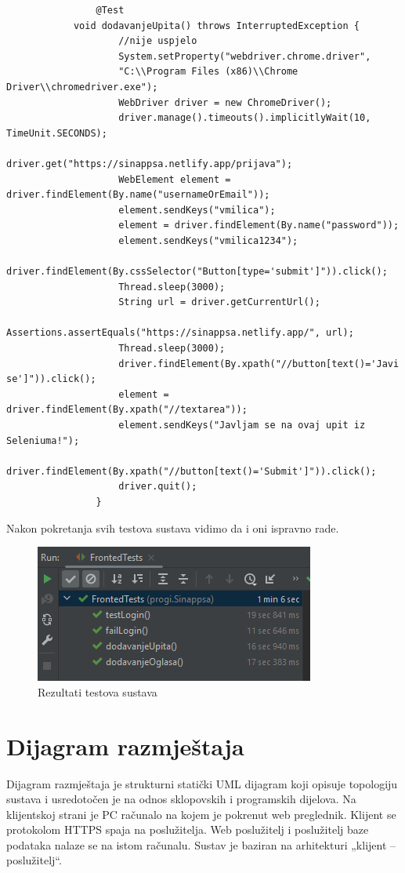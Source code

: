 			\begin{verbatim}
			    @Test
		    void dodavanjeUpita() throws InterruptedException {
			        //nije uspjelo
			        System.setProperty("webdriver.chrome.driver", 
			        "C:\\Program Files (x86)\\Chrome Driver\\chromedriver.exe");
			        WebDriver driver = new ChromeDriver();
			        driver.manage().timeouts().implicitlyWait(10, TimeUnit.SECONDS);
		            driver.get("https://sinappsa.netlify.app/prijava");
			        WebElement element = driver.findElement(By.name("usernameOrEmail"));
			        element.sendKeys("vmilica");
			        element = driver.findElement(By.name("password"));
			        element.sendKeys("vmilica1234");
			        driver.findElement(By.cssSelector("Button[type='submit']")).click();
			        Thread.sleep(3000);
			        String url = driver.getCurrentUrl();
			        Assertions.assertEquals("https://sinappsa.netlify.app/", url);
			        Thread.sleep(3000);
			        driver.findElement(By.xpath("//button[text()='Javi se']")).click();
			        element = driver.findElement(By.xpath("//textarea"));
			        element.sendKeys("Javljam se na ovaj upit iz Seleniuma!");
                    driver.findElement(By.xpath("//button[text()='Submit']")).click();
			        driver.quit();
			    }
			\end{verbatim}
			Nakon pokretanja svih testova sustava vidimo da i oni ispravno rade.
			
			\begin{figure}[H]
				\includegraphics[scale=1]{slike/ispitivanje4.PNG} 
				\centering
				\caption{Rezultati testova sustava}
				\label{fig:FrontendTest}
			\end{figure}
			
			\eject 
		
		
		\section{Dijagram razmještaja}
			Dijagram razmještaja je strukturni statički UML dijagram koji opisuje topologiju sustava i usredotočen je na odnos sklopovskih i programskih dijelova. Na klijentskoj strani je PC računalo na kojem je pokrenut web preglednik. Klijent se protokolom HTTPS spaja na poslužitelja. Web poslužitelj i poslužitelj baze podataka nalaze se na istom računalu. Sustav je baziran na arhitekturi „klijent – poslužitelj“.
			
